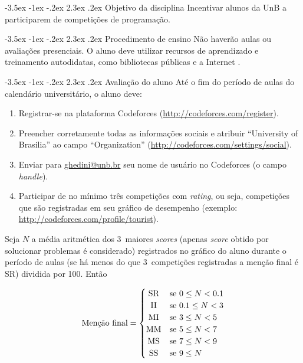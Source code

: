 \documentclass{UnBExam}%
\makeatletter
\newcommand{\numerocontests}{3}
\newcommand{\fatorescala}{100}
\renewcommand\section{\@startsection{section}{1}{\z@}%
	{-3.5ex \@plus -1ex \@minus -.2ex}%
	{2.3ex \@plus.2ex}%
	{\normalfont\normalsize\bfseries}}%
\renewcommand{\indent}{\hspace{.5cm}}
\makeatother
\begin{document}
	
\section{Objetivo da disciplina}
\indent Incentivar alunos da UnB a participarem de competições de programação.

\section{Procedimento de ensino}
\indent Não haverão aulas ou avaliações presenciais. O aluno deve utilizar recursos de aprendizado e treinamento autodidatas, como bibliotecas públicas e a Internet \cite{halim2013competitive,cormen2009introduction,pimentaarticle}.

\section{Avaliação do aluno}
\indent Até o fim do período de aulas do calendário universitário, o aluno deve:
\begin{enumerate}
	\item Registrar-se na plataforma Codeforces (\url{http://codeforces.com/register}).
	\item Preencher corretamente todas as informações sociais e atribuir ``University of Brasilia'' ao campo ``Organization'' (\url{http://codeforces.com/settings/social}).
	\item Enviar para \url{ghedini@unb.br} seu nome de usuário no Codeforces (o campo \textit{handle}).
	\item Participar de no mínimo três competições com \textit{rating}, ou seja, competições que são registradas em seu gráfico de desempenho (exemplo: \url{http://codeforces.com/profile/tourist}).
\end{enumerate}
\indent Seja $N$ a média aritmética dos \numerocontests\ maiores \textit{scores} (apenas \textit{score} obtido por solucionar problemas é considerado) registrados no gráfico do aluno durante o período de aulas (se há menos do que \numerocontests\ competições registradas a menção final é SR) dividida por \fatorescala. Então

\vspace{-.3cm}
\[
\begin{array}{ccc}
	\text{Menção final} =
	\begin{cases}
	\hfill \text{SR} \hfill & \text{se } 0 \leq N < 0.1 \\
	\hfill \text{II} \hfill & \text{se } 0.1 \leq N < 3 \\
	\hfill \text{MI} \hfill & \text{se } 3 \leq N < 5 \\
	\hfill \text{MM} \hfill & \text{se } 5 \leq N < 7 \\
	\hfill \text{MS} \hfill & \text{se } 7 \leq N < 9 \\
	\hfill \text{SS} \hfill & \text{se } 9 \leq N \\
	\end{cases}
\end{array}
\]
\end{document}
